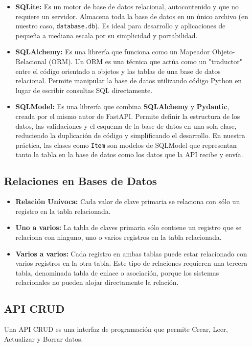 \documentclass[12pt]{article}
\begin{document}
\begin{itemize}
    \item \textbf{SQLite:} Es un motor de base de datos relacional, autocontenido y que no requiere un servidor. Almacena toda la base de datos en un único archivo (en nuestro caso, \texttt{database.db}). Es ideal para desarrollo y aplicaciones de pequeña a mediana escala por su simplicidad y portabilidad.
    
    \item \textbf{SQLAlchemy:} Es una librería que funciona como un Mapeador Objeto-Relacional (ORM). Un ORM es una técnica que actúa como un "traductor" entre el código orientado a objetos y las tablas de una base de datos relacional. Permite manipular la base de datos utilizando código Python en lugar de escribir consultas SQL directamente.
    
    \item \textbf{SQLModel:} Es una librería que combina \textbf{SQLAlchemy} y \textbf{Pydantic}, creada por el mismo autor de FastAPI. Permite definir la estructura de los datos, las validaciones y el esquema de la base de datos en una sola clase, reduciendo la duplicación de código y simplificando el desarrollo. En nuestra práctica, las clases como \texttt{Item} son modelos de SQLModel que representan tanto la tabla en la base de datos como los datos que la API recibe y envía.\cite{ref4}
\end{itemize}

\subsection*{Relaciones en Bases de Datos}
\begin{itemize}
    \item \textbf{Relación Unívoca:} Cada valor de clave primaria se relaciona con sólo un registro en la tabla relacionada.
    \item \textbf{Uno a varios:} La tabla de claves primaria sólo contiene un registro que se relaciona con ninguno, uno o varios registros en la tabla relacionada.
    \item \textbf{Varios a varios:} Cada registro en ambas tablas puede estar relacionado con varios registros en la otra tabla. Este tipo de relaciones requieren una tercera tabla, denominada tabla de enlace o asociación, porque los sistemas relacionales no pueden alojar directamente la relación. \cite{ref5}
\end{itemize}

\subsection*{API CRUD}
Una API CRUD es una interfaz de programación que permite Crear, Leer, Actualizar y Borrar datos. \cite{ref6}
\end{document}
